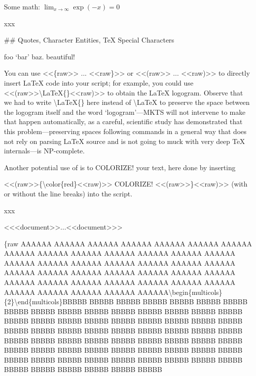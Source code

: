 Some math: $\lim_{x \to \infty} \exp(-x) = 0$\mktsShowpar\par
xxx\mktsShowpar\par
\#\# Quotes, Character Entities, \TeX{} Special Characters\mktsShowpar\par
foo ‘bar’ baz.  beautiful!\mktsShowpar\par
\begin{multicols}{2}
You can use {\mktsStyleCode{}<<\{raw>> ... <<raw\}>>} or {\mktsStyleCode{}<<(raw>> ... <<raw)>>} to directly insert \LaTeX{}
code into your script; for example, you could
use {\mktsStyleCode{}<<(raw>>\textbackslash{}LaTeX\{\}<<raw)>>}
to obtain the \LaTeX{} logogram.
Observe that we had to write {\mktsStyleCode{}\textbackslash{}LaTeX\{\}} here instead of {\mktsStyleCode{}\textbackslash{}LaTeX} to preserve the space between the logogram itself and
the word ‘logogram’—{\mktsStyleBold{}MKTS} will not intervene to make that happen
automatically, as a careful, scientific study has demonstrated
that this problem—preserving spaces following commands in a
general way that does not rely on parsing \LaTeX{}
source and is not going to muck with very deep
\TeX{}
internals—is NP-complete.\mktsShowpar\par
Another potential use of  is to {\color{red}COLORIZE!} your text, here done by inserting\mktsShowpar\par
\begingroup\obeyalllines\mktsStyleCode{}<<(raw>>\{\textbackslash{}color\{red\}<<raw)>>
COLORIZE!
<<(raw>>\}<<raw)>>
\endgroup{}(with or without the line breaks) into the script.
\end{multicols}xxx\mktsShowpar\par
{\mktsStyleCode{}<<<document>>...<<document>>>}\mktsShowpar\par
{\mktsStyleBold\color{violet}{\mktsStyleSymbol█}\{raw {\mktsStyleSymbol}}
AAAAAA AAAAAA AAAAAA AAAAAA AAAAAA AAAAAA AAAAAA AAAAAA AAAAAA AAAAAA AAAAAA AAAAAA
AAAAAA AAAAAA AAAAAA AAAAAA AAAAAA AAAAAA AAAAAA AAAAAA AAAAAA AAAAAA AAAAAA AAAAAA
AAAAAA AAAAAA AAAAAA AAAAAA AAAAAA AAAAAA AAAAAA AAAAAA AAAAAA AAAAAA AAAAAA AAAAAA
AAAAAA AAAAAA AAAAAA AAAAAA\textbackslash{}begin\{multicols\}\{2\}\textbackslash{}end\{multicols\}BBBBB BBBBB BBBBB BBBBB
BBBBB BBBBB BBBBB BBBBB BBBBB BBBBB BBBBB BBBBB BBBBB BBBBB BBBBB BBBBB BBBBB BBBBB BBBBB BBBBB BBBBB BBBBB BBBBB BBBBB BBBBB
BBBBB BBBBB BBBBB BBBBB BBBBB BBBBB BBBBB BBBBB BBBBB BBBBB BBBBB BBBBB BBBBB BBBBB BBBBB BBBBB BBBBB BBBBB BBBBB BBBBB BBBBB
BBBBB BBBBB BBBBB BBBBB BBBBB BBBBB BBBBB BBBBB BBBBB BBBBB BBBBB BBBBB BBBBB BBBBB BBBBB BBBBB BBBBB BBBBB BBBBB BBBBB BBBBB
